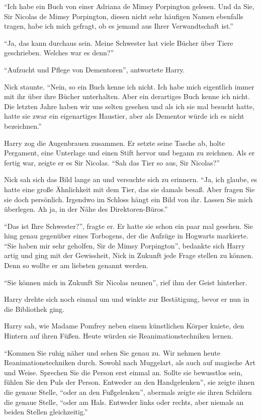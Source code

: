 \enquote{Ich habe ein Buch von einer Adriana de Mimsy Porpington gelesen. Und da Sie, Sir Nicolas de Mimsy Porpington, diesen nicht sehr häufigen Namen ebenfalls tragen, habe ich mich gefragt, ob es jemand aus Ihrer Verwandtschaft ist.}

\enquote{Ja, das kann durchaus sein. Meine Schwester hat viele Bücher über Tiere geschrieben. Welches war es denn?}

\enquote{Aufzucht und Pflege von Dementoren}, antwortete Harry.

Nick staunte. \enquote{Nein, so ein Buch kenne ich nicht. Ich habe mich eigentlich immer mit ihr über ihre Bücher unterhalten. Aber ein derartiges Buch kenne ich nicht. \gst Die letzten Jahre haben wir uns selten gesehen und als ich sie mal besucht hatte, hatte sie zwar ein eigenartiges Haustier, aber als Dementor würde ich es nicht bezeichnen.}

Harry zog die Augenbrauen zusammen. Er setzte seine Tasche ab, holte Pergament, eine Unterlage und einen Stift hervor und begann zu zeichnen. Als er fertig war, zeigte er es Sir Nicolas. \enquote{Sah das Tier so aus, Sir Nicolas?}

Nick sah sich das Bild lange an und versuchte sich zu erinnern. \enquote{Ja, ich glaube, es hatte eine große Ähnlichkeit mit dem Tier, das sie damals besaß. Aber fragen Sie sie doch persönlich. Irgendwo im Schloss hängt ein Bild von ihr. Lassen Sie mich überlegen. \gst Ah ja, in der Nähe des Direktoren-Büros.}

\enquote{Das ist Ihre Schwester?}, fragte er. Er hatte sie schon ein paar mal gesehen. Sie hing genau gegenüber eines Torbogens, der die Aufzüge in Hogwarts markierte. \enquote{Sie haben mir sehr geholfen, Sir de Mimsy Porpington}, bedankte sich Harry artig und ging mit der Gewissheit, Nick in Zukunft jede Frage stellen zu können. Denn so wollte er am liebsten genannt werden.

\enquote{Sie können mich in Zukunft Sir Nicolas nennen}, rief ihm der Geist hinterher.

Harry drehte sich noch einmal um und winkte zur Bestätigung, bevor er nun in die Bibliothek ging.

\trenn

Harry sah, wie Madame Pomfrey neben einem künstlichen Körper kniete, den Hintern auf ihren Füßen. Heute würden sie Reanimationstechniken lernen.

\enquote{Kommen Sie ruhig näher und sehen Sie genau zu. Wir nehmen heute Reanimationstechniken durch. Sowohl nach Muggelart, als auch auf magische Art und Weise. \gst Sprechen Sie die Person erst einmal an. Sollte sie bewusstlos sein, fühlen Sie den Puls der Person. Entweder an den Handgelenken}, sie zeigte ihnen die genaue Stelle, \enquote{oder an den Fußgelenken}, abermals zeigte sie ihren Schülern die genaue Stelle, \enquote{oder am Hals. Entweder links oder rechts, aber niemals an beiden Stellen gleichzeitig.}

